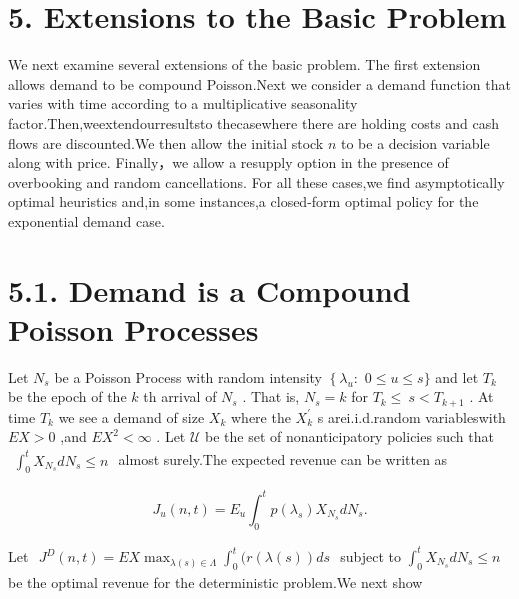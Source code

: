 \section{5. Extensions to the Basic
Problem}\label{extensions-to-the-basic-problem}

We next examine several extensions of the basic problem. The first
extension allows demand to be compound Poisson.Next we consider a demand
function that varies with time according to a multiplicative seasonality
factor.Then,weextendourresultsto thecasewhere there are holding costs
and cash flows are discounted.We then allow the initial stock \(n\) to
be a decision variable along with price. Finally，we allow a resupply
option in the presence of overbooking and random cancellations. For all
these cases,we find asymptotically optimal heuristics and,in some
instances,a closed-form optimal policy for the exponential demand case.

\section{5.1. Demand is a Compound Poisson
Processes}\label{demand-is-a-compound-poisson-processes}

Let \(N _ { s }\) be a Poisson Process with random intensity
\(\left\{ \lambda _ { u } \colon \right.\) \(0 \leq u \leq s \}\) and
let \(T _ { k }\) be the epoch of the \(k\) th arrival of \(N _ { s }\)
. That is, \(N _ { s } = k\) for \(T _ { k } \le \ s < T _ { k + 1 }\) .
At time \(T _ { k }\) we see a demand of size \(X _ { k }\) where the
\({ X } _ { k } ^ { \prime }\) s arei.i.d.random variableswith
\(E X > 0\) ,and \(E X ^ { 2 } < \infty\) . Let \(\mathcal { U }\) be
the set of nonanticipatory policies such that
\(\begin{array} { r } { \int _ { 0 } ^ { t } X _ { N _ { s } } d N _ { s } \leq n } \end{array}\)
almost surely.The expected revenue can be written as

\[
J _ { u } ( n , t ) = E _ { u } \int _ { 0 } ^ { t } p ( \lambda _ { s } ) X _ { N _ { s } } d N _ { s } .
\]

Let
\(\begin{array} { r } { J ^ { D } ( n , t ) = E X \operatorname* { m a x } _ { \lambda ( s ) \in \Lambda } \int _ { 0 } ^ { t } \big ( r ( \lambda ( s ) ) d s } \end{array}\)
subject to \(\int _ { 0 } ^ { t } X _ { N _ { s } } d N _ { s } \leq n\)
be the optimal revenue for the deterministic problem.We next show

